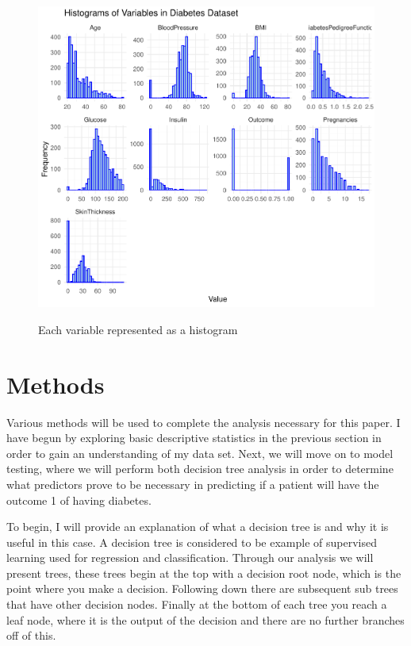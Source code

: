 \documentclass[12pt]{article}
\begin{document}
  \begin{figure}[tbp]
    \centering
    \caption{Each variable represented as a histogram}
      \includegraphics[width=\textwidth]{Histograms.pdf}
      \label{fig:histogram}
      \end{figure}

\section{Methods}
\label{sec:meth}
    Various methods will be used to complete the analysis necessary for this paper. I have begun by exploring basic descriptive statistics in
    the previous section in order to gain an understanding of my data set. Next, we will move on to model testing, where we will perform both 
    decision tree analysis in order to determine what predictors prove to be necessary in predicting if a patient
    will have the outcome 1 of having diabetes. 

    To begin, I will provide an explanation of what a decision tree is and why it is useful in this case. A decision tree is considered
    to be example of supervised learning used for regression and classification. Through our analysis we will present trees, these trees
    begin at the top with a decision root node, which is the point where you make a decision. Following down there are subsequent sub trees
    that have other decision nodes. Finally at the bottom of each tree you reach a leaf node, where it is the output of the decision and 
    there are no further branches off of this.  
    
\end{document}
